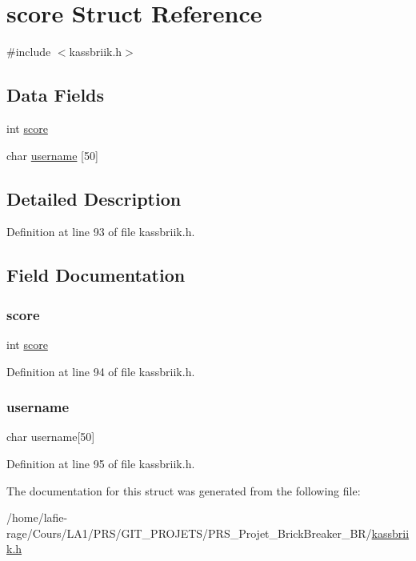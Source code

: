 \hypertarget{structscore}{}\section{score Struct Reference}
\label{structscore}


{\ttfamily \#include $<$kassbriik.\+h$>$}

\subsection*{Data Fields}
\begin{DoxyCompactItemize}
\item 
int \hyperlink{structscore_aef160b7437d94056f1dc59646cd5b87d}{score}
\item 
char \hyperlink{structscore_a3dae4259c0ca612dbb2b1ac5f21def5d}{username} \mbox{[}50\mbox{]}
\end{DoxyCompactItemize}


\subsection{Detailed Description}


Definition at line 93 of file kassbriik.\+h.



\subsection{Field Documentation}
\mbox{\label{structscore_aef160b7437d94056f1dc59646cd5b87d}} 
\subsubsection{\texorpdfstring{score}{score}}
{\footnotesize\ttfamily int \hyperlink{structscore}{score}}



Definition at line 94 of file kassbriik.\+h.

\mbox{\label{structscore_a3dae4259c0ca612dbb2b1ac5f21def5d}} 
\subsubsection{\texorpdfstring{username}{username}}
{\footnotesize\ttfamily char username\mbox{[}50\mbox{]}}



Definition at line 95 of file kassbriik.\+h.



The documentation for this struct was generated from the following file\+:\begin{DoxyCompactItemize}
\item 
/home/lafie-\/rage/\+Cours/\+L\+A1/\+P\+R\+S/\+G\+I\+T\+\_\+\+P\+R\+O\+J\+E\+T\+S/\+P\+R\+S\+\_\+\+Projet\+\_\+\+Brick\+Breaker\+\_\+\+B\+R/\hyperlink{kassbriik_8h}{kassbriik.\+h}\end{DoxyCompactItemize}
